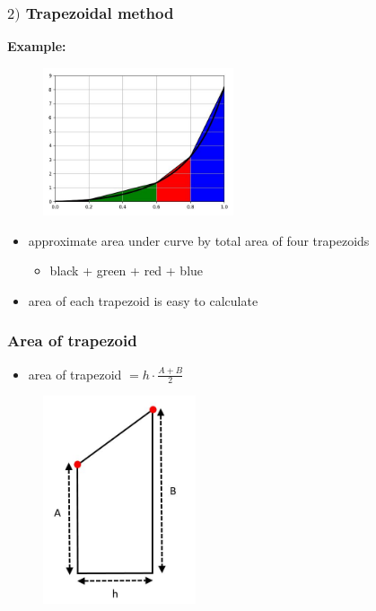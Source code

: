 \documentclass[english,14pt]{beamer}
\newcommand\red[1]{{\color{red} #1}}
\newcommand\blue[1]{{\color{blue} #1}}
\newcommand\darkGreen[1]{{\color{darkGreen} #1}}
\begin{document}

\begin{frame}[fragile]

\frametitle{$2)$ Trapezoidal method}

\textbf{Example:}
\vspace*{-5mm}
\begin{figure}[ht]
	\centering
	\includegraphics[width=0.5\textwidth]{figures/fourPanel}
\end{figure}
\vspace*{-3mm}
\begin{itemize}
	\item approximate area under curve by total area of four trapezoids
	\begin{itemize}
		\item black + \darkGreen{green} + \red{red} + \blue{blue}
	\end{itemize}
	\item area of each trapezoid is easy to calculate
\end{itemize}



\end{frame}


\begin{frame}[fragile]

\frametitle{Area of trapezoid}

\begin{itemize}
	\item area of trapezoid $= h\cdot\frac{A+B}{2}$
\end{itemize}
\vspace*{-3mm}
\begin{figure}[ht]
	\centering
	\includegraphics[width=0.4\textwidth]{figures/trapezoidArea}
\end{figure}

\end{frame}
\end{document}
